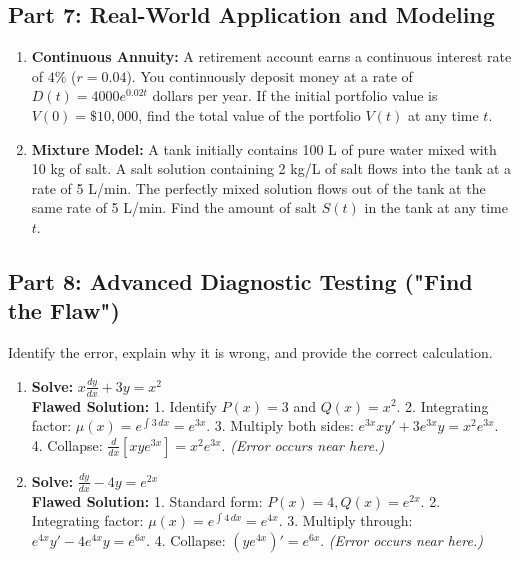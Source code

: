 \documentclass[11pt]{article}
\begin{document}
\subsection*{Part 7: Real-World Application and Modeling}
\begin{enumerate}[label=\textbf{\arabic*.}, start=27]
    \item \textbf{Continuous Annuity:} A retirement account earns a continuous interest rate of $4\%$ ($r=0.04$). You continuously deposit money at a rate of $D(t) = 4000e^{0.02t}$ dollars per year. If the initial portfolio value is $V(0) = \$10,000$, find the total value of the portfolio $V(t)$ at any time $t$.
    
    \item \textbf{Mixture Model:} A tank initially contains 100 L of pure water mixed with 10 kg of salt. A salt solution containing 2 kg/L of salt flows into the tank at a rate of 5 L/min. The perfectly mixed solution flows out of the tank at the same rate of 5 L/min. Find the amount of salt $S(t)$ in the tank at any time $t$.
\end{enumerate}

\subsection*{Part 8: Advanced Diagnostic Testing ("Find the Flaw")}
Identify the error, explain why it is wrong, and provide the correct calculation.
\begin{enumerate}[label=\textbf{\arabic*.}, start=29]
    \item \textbf{Solve:} $\displaystyle x \frac{dy}{dx} + 3y = x^2$\\
    \textbf{Flawed Solution:} 1. Identify $P(x) = 3$ and $Q(x) = x^2$. 2. Integrating factor: $\mu(x) = e^{\int 3 \, dx} = e^{3x}$. 3. Multiply both sides: $e^{3x} x y' + 3 e^{3x} y = x^2 e^{3x}$. 4. Collapse: $\frac{d}{dx}[x y e^{3x}] = x^2 e^{3x}$. \textit{(Error occurs near here.)}
    
    \item \textbf{Solve:} $\displaystyle \frac{dy}{dx} - 4y = e^{2x}$\\
    \textbf{Flawed Solution:} 1. Standard form: $P(x) = 4, Q(x) = e^{2x}$. 2. Integrating factor: $\mu(x) = e^{\int 4 \, dx} = e^{4x}$. 3. Multiply through: $e^{4x} y' - 4 e^{4x} y = e^{6x}$. 4. Collapse: $(y e^{4x})' = e^{6x}$. \textit{(Error occurs near here.)}
\end{enumerate}

\newpage
\end{document}
